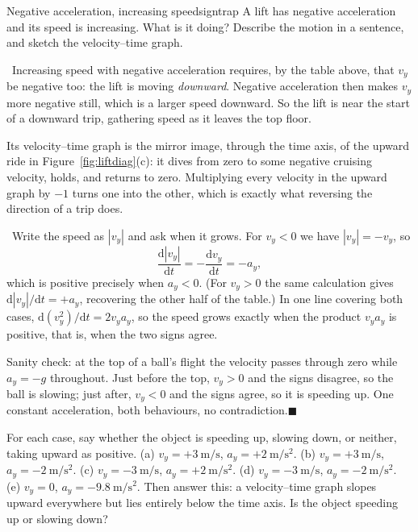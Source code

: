 \documentclass[11pt,twoside,openany]{book}
\newcommand{\dd}{\mathrm{d}}
\newcommand{\deriv}[2]{\frac{\dd #1}{\dd #2}}
\newcounter{check}[chapter]
\newcommand{\viewtag}[3]{\fcolorbox{#2}{#3}{\footnotesize\textbf{\textcolor{#2}{#1}}}}
\newcommand{\elemtag}{\viewtag{Elementary}{elemcol}{elempale}}
\newcommand{\calctag}{\viewtag{Calculus}{calccol}{calcpale}}
\newcommand{\elem}{\par\medskip\noindent\elemtag\ }
\newcommand{\calc}{\par\medskip\noindent\calctag\ }
\newcommand{\qed}{\hfill$\blacksquare$}
\begin{document}
\begin{example}{Negative acceleration, increasing speed}{signtrap}
A lift has negative acceleration and its speed is increasing. What is it doing? Describe the motion in a sentence, and sketch the velocity--time graph.

\elem Increasing speed with negative acceleration requires, by the table above, that $v_y$ be negative too: the lift is moving \emph{downward}. Negative acceleration then makes $v_y$ more negative still, which is a larger speed downward. So the lift is near the start of a downward trip, gathering speed as it leaves the top floor.

Its velocity--time graph is the mirror image, through the time axis, of the upward ride in Figure~\ref{fig:liftdiag}(c): it dives from zero to some negative cruising velocity, holds, and returns to zero. Multiplying every velocity in the upward graph by $-1$ turns one into the other, which is exactly what reversing the direction of a trip does.

\calc Write the speed as $|v_y|$ and ask when it grows. For $v_y < 0$ we have $|v_y| = -v_y$, so
\[
\deriv{|v_y|}{t} = -\deriv{v_y}{t} = -a_y,
\]
which is positive precisely when $a_y < 0$. (For $v_y > 0$ the same calculation gives $\dd|v_y|/\dd t = +a_y$, recovering the other half of the table.) In one line covering both cases, $\dd(v_y^2)/\dd t = 2 v_y a_y$, so the speed grows exactly when the product $v_y a_y$ is positive, that is, when the two signs agree.

Sanity check: at the top of a ball's flight the velocity passes through zero while $a_y = -g$ throughout. Just before the top, $v_y > 0$ and the signs disagree, so the ball is slowing; just after, $v_y < 0$ and the signs agree, so it is speeding up. One constant acceleration, both behaviours, no contradiction.\qed
\end{example}

\begin{checkbox}
For each case, say whether the object is speeding up, slowing down, or neither, taking upward as positive. (a) $v_y = +\SI{3}{\metre\per\second}$, $a_y = +\SI{2}{\metre\per\second\squared}$. (b) $v_y = +\SI{3}{\metre\per\second}$, $a_y = \SI{-2}{\metre\per\second\squared}$. (c) $v_y = \SI{-3}{\metre\per\second}$, $a_y = +\SI{2}{\metre\per\second\squared}$. (d) $v_y = \SI{-3}{\metre\per\second}$, $a_y = \SI{-2}{\metre\per\second\squared}$. (e) $v_y = 0$, $a_y = \SI{-9.8}{\metre\per\second\squared}$. Then answer this: a velocity--time graph slopes upward everywhere but lies entirely below the time axis. Is the object speeding up or slowing down?
\end{checkbox}
\end{document}
